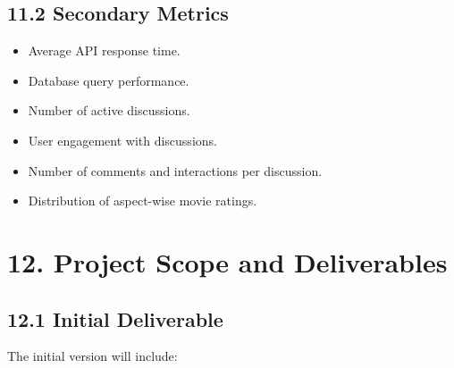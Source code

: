 \documentclass[11pt,a4paper]{article}
\begin{document}
\subsection{11.2 Secondary Metrics}

\begin{itemize}

    \item Average API response time.

    \item Database query performance.

    \item Number of active discussions.

    \item User engagement with discussions.

    \item Number of comments and interactions per discussion.

    \item Distribution of aspect-wise movie ratings.

\end{itemize}



\section{12. Project Scope and Deliverables}

\subsection{12.1 Initial Deliverable}

The initial version will include:
\end{document}
